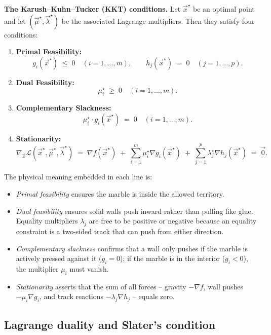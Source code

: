 \begin{formalbox}
\label{ch36:thm-kkt}
\textbf{The Karush--Kuhn--Tucker (KKT) conditions.} Let $\vec{x}^\star$ be an optimal point and let $(\vec{\mu}^\star, \vec{\lambda}^\star)$ be the associated Lagrange multipliers. Then they satisfy four conditions:
\begin{enumerate}
  \item \textbf{Primal Feasibility:}
  \[
    g_i(\vec{x}^\star) \;\le\; 0 \quad (i = 1, \dots, m), \qquad h_j(\vec{x}^\star) \;=\; 0 \quad (j = 1, \dots, p).
  \]
  \item \textbf{Dual Feasibility:}
  \[
    \mu_i^\star \;\ge\; 0 \quad (i = 1, \dots, m).
  \]
  \item \textbf{Complementary Slackness:}
  \[
    \mu_i^\star \cdot g_i(\vec{x}^\star) \;=\; 0 \quad (i = 1, \dots, m).
  \]
  \item \textbf{Stationarity:}
  \[
    \nabla_{\vec{x}} \mathcal{L}(\vec{x}^\star, \vec{\mu}^\star, \vec{\lambda}^\star) \;=\; \nabla f(\vec{x}^\star) \;+\; \sum_{i=1}^{m} \mu_i^\star \nabla g_i(\vec{x}^\star) \;+\; \sum_{j=1}^{p} \lambda_j^\star \nabla h_j(\vec{x}^\star) \;=\; \vec{0}.
  \]
\end{enumerate}
\end{formalbox}

The physical meaning embedded in each line is:
\begin{itemize}
  \item \emph{Primal feasibility} ensures the marble is inside the allowed territory.
  \item \emph{Dual feasibility} ensures solid walls push inward rather than pulling like glue. Equality multipliers $\lambda_j$ are free to be positive or negative because an equality constraint is a two-sided track that can push from either direction.
  \item \emph{Complementary slackness} confirms that a wall only pushes if the marble is actively pressed against it ($g_i = 0$); if the marble is in the interior ($g_i < 0$), the multiplier $\mu_i$ must vanish.
  \item \emph{Stationarity} asserts that the sum of all forces -- gravity $-\nabla f$, wall pushes $-\mu_i \nabla g_i$, and track reactions $-\lambda_j \nabla h_j$ -- equals zero.
\end{itemize}

\subsection{Lagrange duality and Slater's condition}
\label{ch36:duality}

